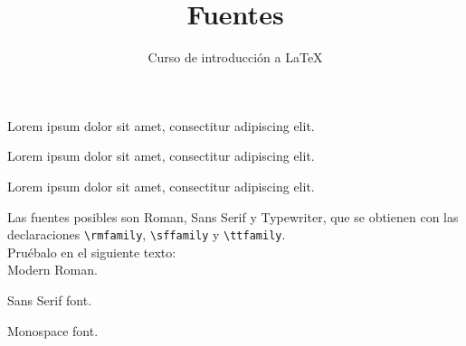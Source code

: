 \documentclass[10pt,letterpaper]{article}
\title{Fuentes}
\author{Curso de introducción a LaTeX}
\begin{document}
\maketitle
Lorem ipsum dolor sit amet, consectitur adipiscing elit.

{\rmfamily Lorem ipsum dolor sit amet, consectitur adipiscing elit.}

{\ttfamily Lorem ipsum dolor sit amet, consectitur adipiscing elit.}

\vspace{0.5cm}

Las fuentes posibles son Roman, Sans Serif y Typewriter,
que se obtienen con las declaraciones \texttt{\textbackslash rmfamily}, \texttt{\textbackslash sffamily} y \texttt{\textbackslash ttfamily}.\\

Pruébalo en el siguiente texto:\\

\rmfamily Modern Roman.

\sffamily Sans Serif font.

\ttfamily Monospace font.
\end{document}
